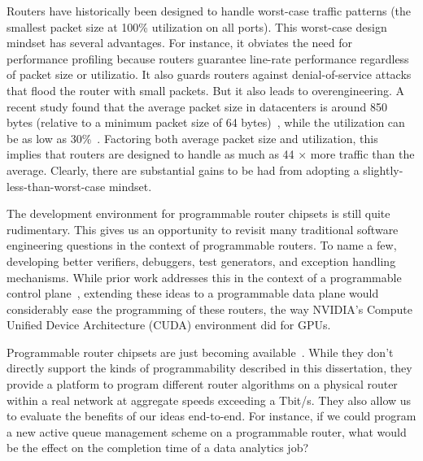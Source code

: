  Routers have historically been
designed to handle worst-case traffic patterns (\ie the smallest packet size at
100\% utilization on all ports). This worst-case design mindset has several
advantages. For instance, it obviates the need for performance profiling
because routers guarantee line-rate performance regardless of packet size or
utilizatio. It also guards routers against denial-of-service attacks that flood
the router with small packets. But it also leads to overengineering. A recent
study found that the average packet size in datacenters is around 850 bytes
(relative to a minimum packet size of 64 bytes)~\cite{theo_dc}, while the
utilization can be as low as 30\%~\cite{theo_dc}. Factoring both average packet
size and utilization, this implies that routers are designed to handle as much
as 44 $\times$ more traffic than the average. Clearly, there are substantial
gains to be had from adopting a slightly-less-than-worst-case mindset.

The development environment for programmable router chipsets is still quite
rudimentary. This gives us an opportunity to revisit many traditional software
engineering questions in the context of programmable routers. To name a few,
developing better verifiers, debuggers, test generators, and exception handling
mechanisms. While prior work addresses this in the context of a programmable
control plane~\cite{test_gen, hsa}, extending these ideas to a programmable
data plane would considerably ease the programming of these routers, the way
NVIDIA's Compute Unified Device Architecture (CUDA) environment did for GPUs.

Programmable router chipsets are just becoming available~\cite{tofino}. While
they don't directly support the kinds of programmability described in this
dissertation, they provide a platform to program different router algorithms on
a physical router within a real network at aggregate speeds exceeding a Tbit/s.
They also allow us to evaluate the benefits of our ideas end-to-end. For
instance, if we could program a new active queue management scheme on a
programmable router, what would be the effect on the completion time of a
data analytics job?

